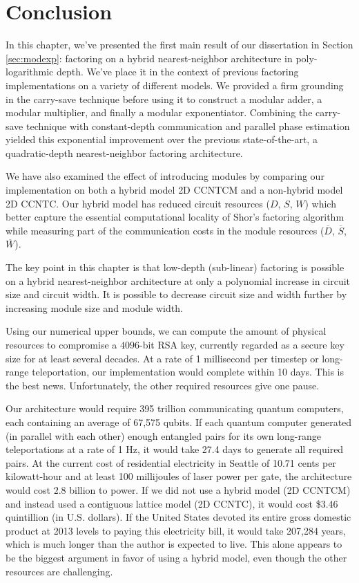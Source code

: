 \section{Conclusion}
\label{sec:fpl-conclude}

In this chapter, we've presented the first main result of
our dissertation in Section \ref{sec:modexp}:
factoring on a hybrid nearest-neighbor architecture in poly-logarithmic depth.
We've place it in the context of previous factoring implementations on a
variety of different models. We provided a firm grounding
in the carry-save technique before using it to construct
a modular adder, a modular multiplier, and finally a
modular exponentiator. Combining the carry-save technique
with constant-depth
communication and parallel phase estimation yielded
this exponential improvement over the previous
state-of-the-art, a quadratic-depth nearest-neighbor
factoring architecture.

We have also examined the
effect of introducing modules by comparing our
implementation on both a hybrid model \textsf{2D CCNTCM}
and a non-hybrid model \textsf{2D CCNTC}.
Our hybrid model has reduced circuit resources
($D$, $S$, $W$) which better
capture the essential computational locality of Shor's factoring
algorithm while measuring part of the communication
costs in the module resources ($\overline{D}$, $\overline{S}$, $\overline{W}$).

The key point in this chapter is that
low-depth (sub-linear) factoring is possible
on a hybrid nearest-neighbor architecture
at only a polynomial increase in circuit size
and 
circuit width. It is possible to decrease
circuit size and width further by increasing
module size and module width.

Using our numerical
upper bounds, we can compute the amount of
physical resources to compromise a $4096$-bit
RSA key, currently regarded as a secure key size
for at least several decades. At a rate of
1 millisecond per timestep or long-range
teleportation, our implementation would
complete within 10 days. This is the best news.
Unfortunately, the other required resources
give one pause.

 Our architecture
would require 395 trillion communicating quantum
computers, each containing an average of
67,575 qubits. If each quantum computer generated
(in parallel with each other)
enough entangled pairs for its own long-range
teleportations at a rate of 1 Hz, it would
take 27.4 days to generate all required pairs.
At the current cost of residential electricity 
in Seattle of 10.71 cents per kilowatt-hour and
at least 100 millijoules of laser
power per gate,
the architecture would cost $2.8$ billion
to power. If we did not use a hybrid model
(\textsf{2D CCNTCM}) and instead used a
contiguous lattice model (\textsf{2D CCNTC}),
it would cost \$3.46 quintillion (in U.S. dollars).
If the United States devoted its entire gross domestic
product at 2013 levels to paying this electricity bill,
it would take 207,284 years, which is much longer than
the author is expected to live. This alone appears
to be the biggest argument in favor of using
a hybrid model, even though the other resources
are challenging.

